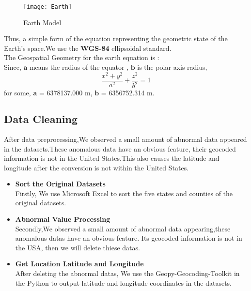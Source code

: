 \documentclass{mcmthesis}
\begin{document}
\begin{figure}[!h] %
	\small
	\centering
	\texttt{[image: Earth]}
	\caption{Earth Model} \label{fig:Earth model}
\end{figure}


\noindent Thus, a simple form of the equation representing the geometric state of the Earth's space.We use the \textbf {WGS-84} ellipsoidal standard.\\


\noindent The Geospatial Geometry for the earth equation is :\\
\noindent Since, $\bm a$ means the radius of the equator ,  $\bm b$ is the polar axis radius, \\%
\begin{equation}
\frac{x^2+y^2}{a^2}+\frac{z^2}{b^2} = 1  %
\end{equation}
\noindent for some, $\bm a $ = 6378137.000 m, $\bm b$ = 6356752.314 m. \\

\subsection{Data Cleaning} %
After data preprocessing,We observed a small amount of abnormal data appeared in the datasets.These anomalous data have an obvious feature, their geocoded information is not in the United States.This also causes the latitude and longitude after the conversion is not within the United States.
\begin{itemize}
	\item \textbf {Sort the Original Datasets} \\ %
	 Firstly, We use Microsoft Excel to sort the five states and counties of the original datasets.
	
	\item \textbf {Abnormal Value Processing}  \\ %
	Secondly,We observed a small amount of abnormal data appearing,these anomalous datas have an obvious feature. Its geocoded information is not in the USA, then we will delete thiese datas.
    
    \item \textbf{Get Location Latitude and Longitude} \\%
    After deleting the abnormal datas, We use the Geopy-Geocoding-Toolkit in the Python to output latitude and longitude coordinates in the datasets.
  
\end{itemize}
\end{document}
